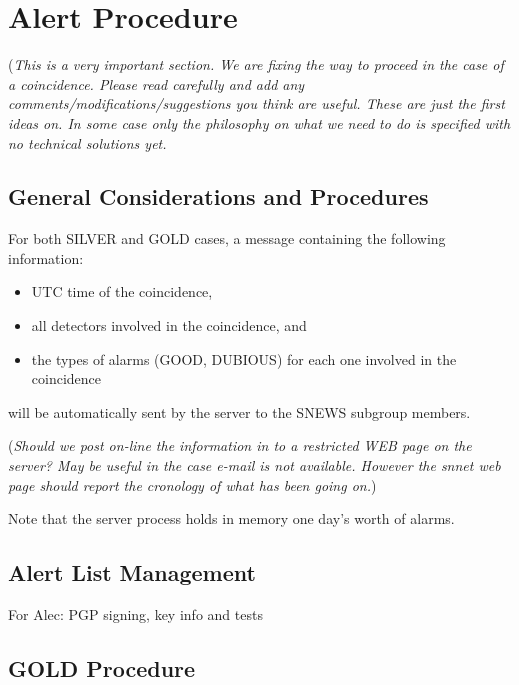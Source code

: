 \documentclass{article}
\begin{document}
\section{Alert Procedure}
({\it This is a very important section. We are fixing the way to proceed
in the case of a coincidence. Please read carefully and add any 
comments/modifications/suggestions you think are useful. These are 
just the first ideas on. In some case  only the philosophy on what we need 
to do is specified with no technical solutions yet.}\\

\subsection{General Considerations and Procedures}

For both SILVER and GOLD cases, a message containing the following
information:

\begin{itemize}
\item UTC time of the coincidence,
\item all detectors involved in the coincidence, and
\item the types of alarms (GOOD, DUBIOUS) for each one involved
in the coincidence
\end{itemize}

will be automatically sent by the server to the SNEWS subgroup
members. 

({\it Should we post on-line the information in to a 
restricted WEB page on the server? May be useful in the case e-mail is not available. 
However the snnet web page should report the cronology of what has been going on.})

 
Note that the server process holds in memory one day's worth of
alarms.  

\subsection{Alert List Management}

For Alec: PGP signing, key info and tests

\subsection{GOLD Procedure}\label{GOLD}
\end{document}
